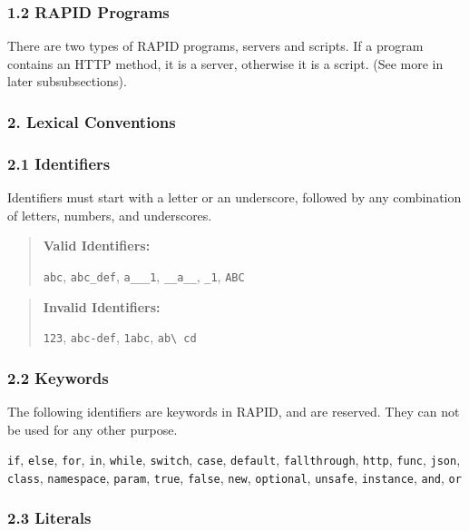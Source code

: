 \subsubsection*{1.2 RAPID Programs}\label{rapid-programs}

There are two types of RAPID programs, servers and scripts. If a program
contains an HTTP method, it is a server, otherwise it is a script. (See
more in later subsubsections).

\subsubsection*{2. Lexical Conventions}\label{lexical-conventions}

\subsubsection*{2.1 Identifiers}\label{identifiers}

Identifiers must start with a letter or an underscore, followed by any
combination of letters, numbers, and underscores.

\begin{quote}
\textbf{Valid Identifiers:}

\texttt{abc}, \texttt{abc\_def}, \texttt{a\_\_\_1}, \texttt{\_\_a\_\_},
\texttt{\_1}, \texttt{ABC}
\end{quote}

\begin{quote}
\textbf{Invalid Identifiers:}

\texttt{123}, \texttt{abc-def}, \texttt{1abc},
\texttt{ab\textbackslash{} cd}
\end{quote}

\subsubsection*{2.2 Keywords}\label{keywords}

The following identifiers are keywords in RAPID, and are reserved. They
can not be used for any other purpose.

\texttt{if}, \texttt{else}, \texttt{for}, \texttt{in}, \texttt{while},
\texttt{switch}, \texttt{case}, \texttt{default}, \texttt{fallthrough},
\texttt{http}, \texttt{func}, \texttt{json}, \texttt{class},
\texttt{namespace}, \texttt{param}, \texttt{true}, \texttt{false},
\texttt{new}, \texttt{optional}, \texttt{unsafe}, \texttt{instance},
\texttt{and}, \texttt{or}

\subsubsection*{2.3 Literals}\label{literals}

